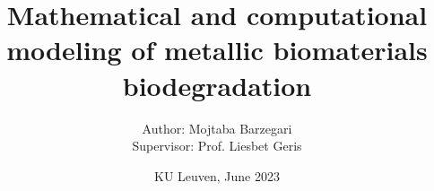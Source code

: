 \documentclass[12pt,a4paper]{report}
\title{Mathematical and computational modeling of metallic biomaterials biodegradation}
\author{Author: Mojtaba Barzegari\\Supervisor: Prof. Liesbet Geris}
\date{KU Leuven, June 2023}
\begin{document}
\maketitle



\tableofcontents

\graphicspath{{chapters/introduction/image/}}


\graphicspath{{chapters/objective/image/}}


\graphicspath{{chapters/core/image/}}


\graphicspath{{chapters/fluid/image/}}


\graphicspath{{chapters/kinetics/image/}}


\graphicspath{{chapters/tissue/image/}}


\graphicspath{{chapters/hpc/image/}}


\graphicspath{{chapters/biodeg/image/}}


\graphicspath{{chapters/bayesian/image/}}


\graphicspath{{chapters/cup/image/}}


\graphicspath{{chapters/infill/image/}}


\graphicspath{{chapters/mandible/image/}}


\graphicspath{{chapters/conclusion/image/}}





\begin{appendices}

\graphicspath{{chapters/appendix/image/}}


\end{appendices}
\end{document}
